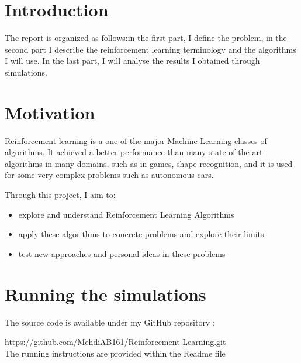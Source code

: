 \documentclass[12pt,a4paper]{article}
\begin{document}
\newpage
\tableofcontents


\newpage

\section*{Introduction}

The report is organized as follows:in the first part, I define the problem, in the second part I describe the reinforcement learning terminology and the algorithms I will use. In the last part, I will analyse the results I obtained through simulations.

\section*{Motivation}
Reinforcement learning is a one of the major Machine Learning classes of algorithms. It achieved a better performance than many state of the art algorithms in many domains, such as in games\cite{mnih-dqn-2015}\cite{44806}, shape recognition\cite{DBLP:journals/corr/RezendeEMBJH16}, and it is used for some very complex problems such as autonomous cars\cite{Stafylopatis98autonomousvehicle}.

Through this project, I aim to:
\begin{itemize}
\item explore and understand Reinforcement Learning Algorithms
\item apply these algorithms to concrete problems and explore their limits
\item test new approaches and personal ideas in these problems
 \end{itemize}

\section*{Running the simulations}
The source code is available under my GitHub repository :

https://github.com/MehdiAB161/Reinforcement-Learning.git
\\The running instructions are provided within the Readme file


\end{document}
